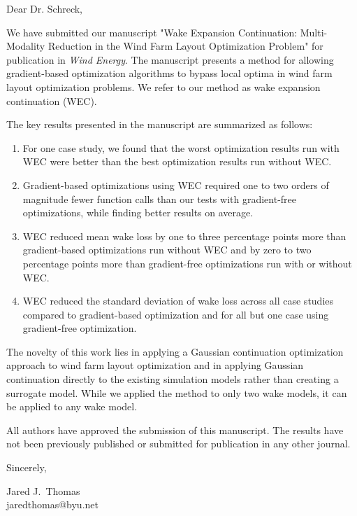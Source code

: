 \documentclass[a4paper,11pt]{texMemo}
\begin{document}
	\maketitle
	
	Dear Dr. Schreck,
	
	We have submitted our manuscript "Wake Expansion Continuation: Multi-Modality Reduction in the Wind Farm Layout Optimization Problem" for publication in \textit{Wind Energy}. The manuscript presents a method for allowing gradient-based optimization algorithms to bypass local optima in wind farm layout optimization problems. We refer to our method as wake expansion continuation (WEC). 
	
	The key results presented in the manuscript are summarized as follows:
	\begin{enumerate}
		\item For one case study, we found that the worst optimization results run with WEC were better than the best optimization results run without WEC.
		\item Gradient-based optimizations using WEC required one to two orders of magnitude fewer function calls than our tests with gradient-free optimizations, while finding better results on average.
		\item WEC reduced mean wake loss by one to three percentage points more than gradient-based optimizations run without WEC and by zero to two percentage points more than gradient-free optimizations run with or without WEC.
		\item WEC reduced the standard deviation of wake loss across all case studies compared to gradient-based optimization and for all but one case using gradient-free optimization.
	\end{enumerate}
	
	The novelty of this work lies in applying a Gaussian continuation optimization approach to wind farm layout optimization and in applying Gaussian continuation directly to the existing simulation models rather than creating a surrogate model. While we applied the method to only two wake models, it can be applied to any wake model. 
	
	All authors have approved the submission of this manuscript. The results have not been previously published or submitted for publication in any other journal.

	\bigskip
	
	\bigskip

	Sincerely,
	
	Jared J.~Thomas \\
	jaredthomas@byu.net
	
\end{document}
